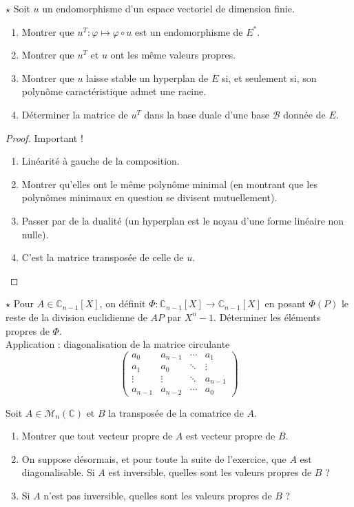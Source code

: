 \documentclass[french,a4paper]{article}
\newcommand{\C}{\mathbb{C}}
\newcommand{\st}{^*}
\theoremstyle{plain}
\theoremstyle{definition}
\theoremstyle{remark}
\begin{document}
\begin{ex}{$\star$}
	Soit $u$ un endomorphisme d'un espace vectoriel de dimension finie.
	\begin{enumerate}
		\item Montrer que $u^T:\varphi\mapsto\varphi\circ u$ est un endomorphisme de $E\st$.
		\item Montrer que $u^T$ et $u$ ont les même valeurs propres.
		\item Montrer que $u$ laisse stable un hyperplan de $E$ si, et seulement si, son polynôme caractéristique admet une racine.
		\item Déterminer la matrice de $u^T$ dans la base duale d'une base $\mathcal{B}$ donnée de $E$.
	\end{enumerate}
\end{ex}
\begin{proof}
	Important !
	\begin{enumerate}
		\item Linéarité à gauche de la composition.
		\item Montrer qu'elles ont le même polynôme minimal (en montrant que les polynômes minimaux en question se divisent mutuellement).
		\item Passer par de la dualité (un hyperplan est le noyau d'une forme linéaire non nulle).
		\item C'est la matrice transposée de celle de $u$.
	\end{enumerate}
\end{proof}

\begin{ex}{$\star$}
	Pour $A\in\C_{n-1}[X]$, on définit $\Phi:\C_{n-1}[X]\to\C_{n-1}[X]$ en posant $\Phi(P)$ le reste de la division euclidienne de $AP$ par $X^n-1$. Déterminer les éléments propres de $\Phi$. \\
	Application : diagonalisation de la matrice circulante $$\begin{pmatrix}
		a_0&a_{n-1}&\cdots&a_1\\
		a_1&a_0&\ddots&\vdots\\
		\vdots&\vdots&\ddots&a_{n-1}\\
		a_{n-1}&a_{n-2}&\cdots&a_0
	\end{pmatrix}$$
\end{ex}

\begin{ex}{}
	Soit $A\in\mathcal{M}_n(\C)$ et $B$ la transposée de la comatrice de $A$.
	\begin{enumerate}
		\item Montrer que tout vecteur propre de $A$ est vecteur propre de $B$.
		\item On suppose désormais, et pour toute la suite de l'exercice, que $A$ est diagonalisable. Si $A$ est inversible, quelles sont les valeurs propres de $B$ ?
		\item Si $A$ n'est pas inversible, quelles sont les valeurs propres de $B$ ?
	\end{enumerate}
\end{ex}
\end{document}
